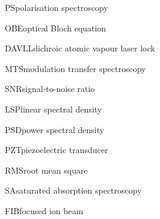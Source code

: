     {PS}{polarisation spectroscopy}
    
    {OBE}{optical Bloch equation}
    
    {DAVLL}{dichroic atomic vapour laser lock}

    {MTS}{modulation transfer spectroscopy}

    {SNR}{signal-to-noise ratio}

    {LSP}{linear spectral density}
    
    {PSD}{power spectral density}
    
    {PZT}{piezoelectric transducer}

    {RMS}{root mean square}
    
    {SA}{saturated absorption spectroscopy}

    {FIB}{focused ion beam}

    
